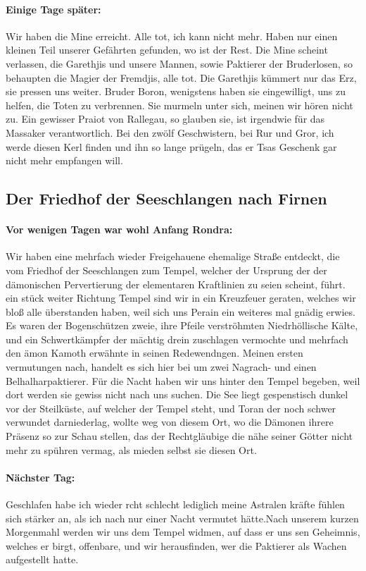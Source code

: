 \paragraph{Einige Tage später:}
Wir haben die Mine erreicht. Alle tot, ich kann nicht mehr. Haben nur einen kleinen Teil unserer Gefährten gefunden, wo ist der Rest. Die Mine scheint verlassen, die Garethjis und unsere Mannen, sowie Paktierer der Bruderlosen, so behaupten die Magier der Fremdjis, alle tot. Die Garethjis kümmert nur das Erz, sie pressen uns weiter. Bruder Boron, wenigstens haben sie eingewilligt, uns zu helfen, die Toten zu verbrennen.
Sie murmeln unter sich, meinen wir hören nicht zu. Ein gewisser Praiot von Rallegau, so glauben sie, ist irgendwie für das Massaker verantwortlich. Bei den zwölf Geschwistern, bei Rur und Gror, ich werde diesen Kerl finden und ihn so lange prügeln, das er Tsas Geschenk gar nicht mehr empfangen will.


\subsection{Der Friedhof der Seeschlangen nach Firnen}
\paragraph{Vor wenigen Tagen war wohl Anfang Rondra:}
Wir haben eine mehrfach wieder Freigehauene ehemalige Straße entdeckt, die vom Friedhof der Seeschlangen zum Tempel, welcher der Ursprung der der dämonischen Pervertierung der elementaren Kraftlinien zu seien scheint, führt. ein stück weiter Richtung Tempel sind wir in ein Kreuzfeuer geraten, welches wir bloß alle überstanden haben, weil sich uns Perain ein weiteres mal gnädig erwies. Es waren der Bogenschützen zweie, ihre Pfeile verströhmten Niedrhöllische Kälte, und ein Schwertkämpfer der mächtig drein zuschlagen vermochte und mehrfach den ämon Kamoth erwähnte in seinen Redewendngen. Meinen ersten vermutungen nach, handelt es sich hier bei um zwei Nagrach- und einen Belhalharpaktierer. Für die Nacht haben wir uns hinter den Tempel begeben, weil dort werden sie gewiss nicht nach uns suchen.
Die See liegt gespenstisch dunkel vor der Steilküste, auf welcher der Tempel steht, und Toran der noch schwer verwundet darniederlag, wollte weg von diesem Ort, wo die Dämonen ihrere Präsenz so zur Schau stellen, das der Rechtgläubige die nähe seiner Götter nicht mehr zu spühren vermag, als mieden selbst sie diesen Ort.

\paragraph{Nächster Tag:}
Geschlafen habe ich wieder rcht schlecht lediglich meine Astralen kräfte fühlen sich stärker an, als ich nach nur einer Nacht vermutet hätte.Nach unserem kurzen Morgenmahl werden wir uns dem Tempel widmen, auf dass er uns sen Geheimnis, welches er birgt, offenbare, und wir herausfinden, wer die Paktierer als Wachen aufgestellt hatte.


